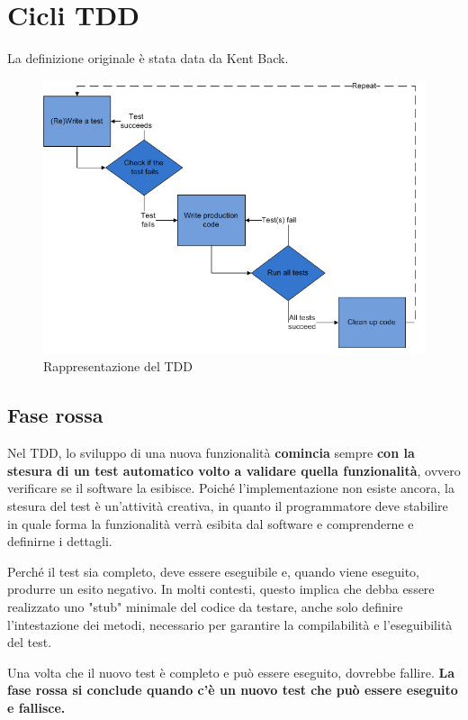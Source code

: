 \documentclass[11pt,a4paper]{book}
\begin{document}
\section{Cicli TDD}
La definizione originale è stata data da Kent Back.
\begin{figure}[h!]
	\begin{center}
		\includegraphics[scale=0.6]{img/001.png}
		\caption{Rappresentazione del TDD}
		\label{fig: 001}
	\end{center}
\end{figure}

\subsection{Fase rossa}
Nel TDD, lo sviluppo di una nuova funzionalità \textbf{comincia} sempre \textbf{con la stesura di un test automatico volto a validare quella funzionalità}, ovvero verificare se il software la esibisce. Poiché l'implementazione non esiste ancora, la stesura del test è un'attività creativa, in quanto il programmatore deve stabilire in quale forma la funzionalità verrà esibita dal software e comprenderne e definirne i dettagli. 

Perché il test sia completo, deve essere eseguibile e, quando viene eseguito, produrre un esito negativo. In molti contesti, questo implica che debba essere realizzato uno "stub" minimale del codice da testare, anche solo definire l'intestazione dei metodi, necessario per garantire la compilabilità e l'eseguibilità del test. 

Una volta che il nuovo test è completo e può essere eseguito, dovrebbe fallire. \textbf{La fase rossa si conclude quando c'è un nuovo test che può essere eseguito e fallisce.}
\end{document}
